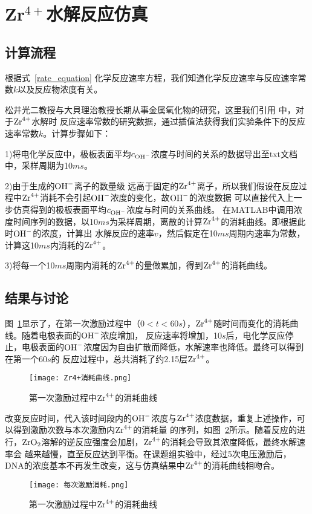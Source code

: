 \section{Zr$^{4+}$水解反应仿真}
\subsection{计算流程}
根据式~\ref{rate_equation} 化学反应速率方程，我们知道化学反应速率与反应速率常数$k$以及反应物浓度有关。

松井光二教授与大貝理治教授长期从事金属氧化物的研究，这里我们引用\parencite{40005382310,doi:10.1111/j.1151-2916.2002.tb00131.x}
中，对于$\ce{Zr^4+}$水解时
反应速率常数的研究数据，通过插值法获得我们实验条件下的反应速率常数$k$。计算步骤如下：

1)将电化学反应中，极板表面平均$c_{\ce{OH-}}$浓度与时间的关系的数据导出至txt文档中，采样周期为10$ms$。

2)由于生成的$\ce{OH-}$离子的数量级
远高于固定的$\ce{Zr^4+}$离子，所以我们假设在反应过程中$\ce{Zr^4+}$消耗不会引起$\ce{OH-}$浓度的变化，故$\ce{OH-}$的浓度数据
可以直接代入上一步仿真得到的极板表面平均$c_{\ce{OH-}}$浓度与时间的关系曲线。
在MATLAB中调用浓度时间序列的数据，以10$ms$为采样周期，离散的计算$\ce{Zr^4+}$的消耗曲线。即根据此时$\ce{OH-}$的浓度，计算出
水解反应的速率$v$，然后假定在10$ms$周期内速率为常数，计算这10$ms$内消耗的$\ce{Zr^4+}$。

3)将每一个10$ms$周期内消耗的$\ce{Zr^4+}$的量做累加，得到$\ce{Zr^4+}$的消耗曲线。
\subsection{结果与讨论}

图~\ref{1stZr}显示了，在第一次激励过程中（$0<t<60s$），$\ce{Zr^4+}$随时间而变化的消耗曲线。随着电极表面的$\ce{OH-}$浓度增加，
反应速率将增加，10$s$后，电化学反应停止，电极表面的$\ce{OH-}$浓度因为自由扩散而降低，水解速率也降低。最终可以得到在第一个60$s$的
反应过程中，总共消耗了约2.15层$\ce{Zr^4+}$。
\begin{figure}[H]
    \centering
    \texttt{[image: Zr4+消耗曲线.png]}
    \caption{第一次激励过程中$\ce{Zr^4+}$的消耗曲线}
    \label{1stZr}
\end{figure}

改变反应时间，代入该时间段内的$\ce{OH-}$浓度与$\ce{Zr^4+}$浓度数据，重复上述操作，可以得到激励次数与本次激励内$\ce{Zr^4+}$的消耗量
的序列，如图~\ref{Zrseq}所示。随着反应的进行，$\ce{ZrO2}$溶解的逆反应强度会加剧，$\ce{Zr^4+}$的消耗会导致其浓度降低，最终水解速率会
越来越慢，直至反应达到平衡。在课题组实验中，经过5次电压激励后，DNA的浓度基本不再发生改变，这与仿真结果中$\ce{Zr^4+}$的消耗曲线相吻合。
\begin{figure}[H]
    \centering
    \texttt{[image: 每次激励消耗.png]}
    \caption{第一次激励过程中$\ce{Zr^4+}$的消耗曲线}
    \label{Zrseq}
\end{figure}

